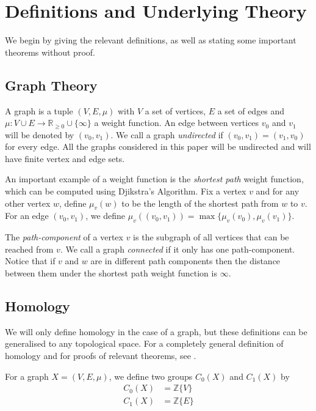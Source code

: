 \documentclass[12pt,a4paper]{amsart}
\numberwithin{equation}{section}
\def\Z{{\mathbb Z}}
\theoremstyle{plain}
\theoremstyle{definition}
\begin{document}
\section*{Definitions and Underlying Theory}

We begin by giving the relevant definitions, as well as stating some important theorems without proof.

\subsection*{Graph Theory}

A graph is a tuple $(V, E, \mu)$ with $V$ a set of vertices, $E$ a set of edges and $\mu : V \cup E \to \mathbb{R}_{\geq 0} \cup \{\infty\}$ a weight function. An edge between vertices $v_0$ and $v_1$ will be denoted by $(v_0, v_1)$. We call a graph \textit{undirected} if $(v_0, v_1) = (v_1, v_0)$ for every edge. All the graphs considered in this paper will be undirected and will have finite vertex and edge sets.

An important example of a weight function is the \textit{shortest path} weight function, which can be computed using Djikstra's Algorithm. Fix a vertex $v$ and for any other vertex $w$, define $\mu_v(w)$ to be the length of the shortest path from $w$ to $v$. For an edge $(v_0, v_1)$, we define $\mu_v((v_0, v_1)) = \max\{\mu_v(v_0), \mu_v(v_1)\}$.

The \textit{path-component} of a vertex $v$ is the subgraph of all vertices that can be reached from $v$. We call a graph \textit{connected} if it only has one path-component. Notice that if $v$ and $w$ are in different path components then the distance between them under the shortest path weight function is $\infty$.

\subsection*{Homology}

We will only define homology in the case of a graph, but these definitions can be generalised to any topological space. For a completely general definition of homology and for proofs of relevant theorems, see \cite{hatcher}.

For a graph $X = (V, E, \mu)$, we define two groups $C_0(X)$ and $C_1(X)$ by
\begin{align*}
C_0(X) &= \Z\{V\}  \\
C_1(X) &= \Z\{E\}
\end{align*}
\end{document}
